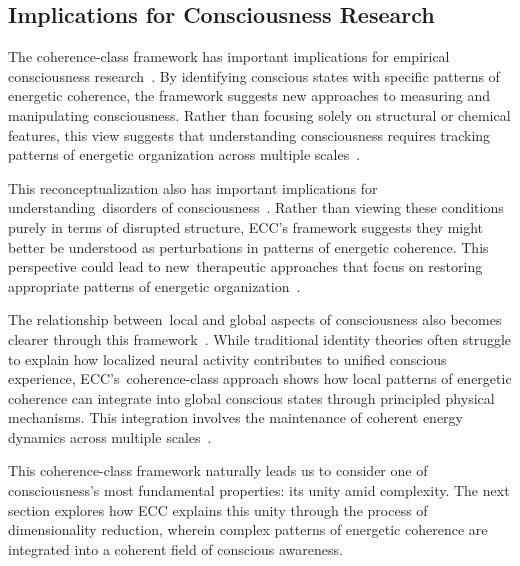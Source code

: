 \subsection*{Implications for Consciousness Research}

The coherence-class framework has important implications for empirical consciousness research~\cite{hunt2024electromagnetic,butlin2023consciousnessartificialintelligenceinsights}. By identifying conscious states with specific patterns of energetic coherence, the framework suggests new approaches to measuring and manipulating consciousness. Rather than focusing solely on structural or chemical features, this view suggests that understanding consciousness requires tracking patterns of energetic organization across multiple scales~\cite{Gidon2020,Beniaguev2021}.

This reconceptualization also has important implications for understanding~disorders of consciousness~\cite{varela1996neurophenomenology,gallagher2020phenomenological}. Rather than viewing these conditions purely in terms of disrupted structure, ECC's framework suggests they might better be understood as perturbations in patterns of energetic coherence. This perspective could lead to new~therapeutic approaches that focus on restoring appropriate patterns of energetic organization~\cite{levin2020revisiting,McFadden2020}.

The relationship between~local and global aspects of consciousness also becomes clearer through this framework~\cite{breakspear2005dynamics,van2025processes}. While traditional identity theories often struggle to explain how localized neural activity contributes to unified conscious experience, ECC's~coherence-class approach shows how local patterns of energetic coherence can integrate into global conscious states through principled physical mechanisms. This integration involves the maintenance of coherent energy dynamics across multiple scales~\cite{pinotsis2023vivo,amil2024theta}.

This coherence-class framework naturally leads us to consider one of consciousness's most fundamental properties: its unity amid complexity. The next section explores how ECC explains this unity through the process of dimensionality reduction, wherein complex patterns of energetic coherence are integrated into a coherent field of conscious awareness.
